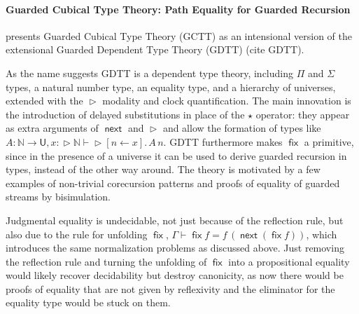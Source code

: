 \documentclass{book}
\DeclareMathOperator{\fix}{\mathsf{fix}}
\DeclareMathOperator{\Later}{\vartriangleright}
\DeclareMathOperator{\next}{\ensuremath{\mathsf{next}}}
\newcommand{\sd}{.\,}
\begin{document}

  \paragraph{Guarded Cubical Type Theory: Path Equality for Guarded Recursion}
  presents Guarded Cubical Type Theory (GCTT) as an intensional
  version of the extensional Guarded Dependent Type Theory (GDTT)
  (cite GDTT).

  As the name suggests GDTT is a dependent type theory, including
  $\Pi$ and $\Sigma$ types, a natural number type, an equality type, and a hierarchy of
  universes, extended with the $\Later$ modality and clock
  quantification. The main innovation is the introduction of delayed
  substitutions in place of the $\star$ operator: they appear as extra
  arguments of $\next$ and $\Later$ and allow the formation of types
  like $ A : \mathbb{N} \to \mathsf{U}, x : \Later \mathbb{N} \vdash
  \Later [n \leftarrow x]\sd A\,n$.
  GDTT furthermore makes $\fix$ a primitive, since in the presence of
  a universe it can be used to derive guarded recursion in types,
  instead of the other way around. The theory is motivated by a few
  examples of non-trivial corecursion patterns and proofs of equality
  of guarded streams by bisimulation.

  Judgmental equality is undecidable, not just because of the
  reflection rule, but also due to the rule for unfolding $\fix$,
  $\Gamma \vdash \fix f = f\,(\next (\fix f))$, which introduces the
  same normalization problems as discussed above. Just removing the
  reflection rule and turning the unfolding of $\fix$ into a
  propositional equality would likely recover decidability but destroy
  canonicity, as now there would be proofs of equality that are not
  given by reflexivity and the eliminator for the equality type would
  be stuck on them.
\end{document}
